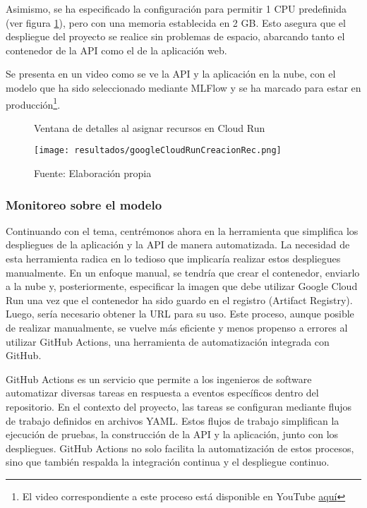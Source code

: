 Asimismo, se ha especificado la configuración para permitir 1 CPU predefinida (ver figura \ref{fig:figuraGoogleCloudRunCreacionRec}), pero con una memoria establecida en 2 GB. Esto asegura que el despliegue del proyecto se realice sin problemas de espacio, abarcando tanto el contenedor de la API como el de la aplicación web. \newline

Se presenta en un video como se ve la API y la aplicación en la nube, con el modelo que ha sido seleccionado mediante MLFlow y se ha marcado para estar en producción\footnote{El video correspondiente a este proceso está disponible en YouTube \href{https://youtu.be/GV5-WZFxAOU?si=juse0Gmu4mX00cAJ}{aquí}}.

\newpage

\begin{figure}[h]
	\centering
	\caption{Ventana de detalles al asignar recursos en Cloud Run}
	\texttt{[image: resultados/googleCloudRunCreacionRec.png]}
	\caption*{\footnotesize Fuente: Elaboración propia}
	\label{fig:figuraGoogleCloudRunCreacionRec}
\end{figure}


\subsubsection{Monitoreo sobre el modelo}

Continuando con el tema, centrémonos ahora en la herramienta que simplifica los despliegues de la aplicación y la API de manera automatizada. La necesidad de esta herramienta radica en lo tedioso que implicaría realizar estos despliegues manualmente. En un enfoque manual, se tendría que crear el contenedor, enviarlo a la nube y, posteriormente, especificar la imagen que debe utilizar Google Cloud Run una vez que el contenedor ha sido guardo en el registro (Artifact Registry). Luego, sería necesario obtener la URL para su uso. Este proceso, aunque posible de realizar manualmente, se vuelve más eficiente y menos propenso a errores al utilizar GitHub Actions, una herramienta de automatización integrada con GitHub. 

\newpage

GitHub Actions es un servicio que permite a los ingenieros de software automatizar diversas tareas en respuesta a eventos específicos dentro del repositorio. En el contexto del proyecto, las tareas se configuran mediante flujos de trabajo definidos en archivos YAML. Estos flujos de trabajo simplifican la ejecución de pruebas, la construcción de la API y la aplicación, junto con los despliegues. GitHub Actions no solo facilita la automatización de estos procesos, sino que también respalda la integración continua y el despliegue continuo. \newline

